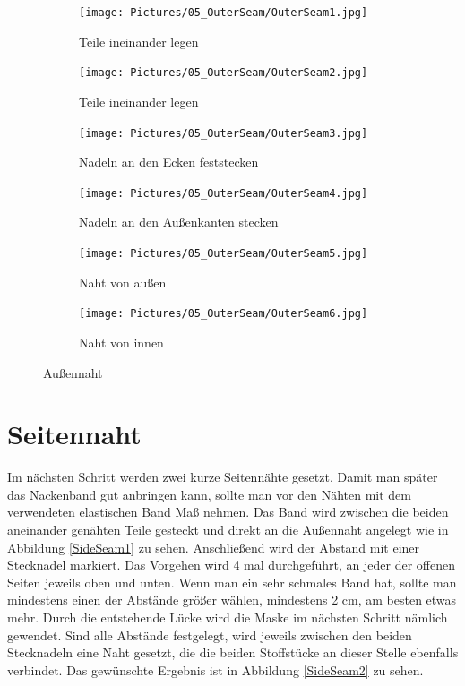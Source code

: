 \documentclass[12pt,parskip=full]{scrartcl}
\begin{document}
\begin{figure}[ht]
    \vspace{0.5cm}
    \centering
    \begin{subfigure}{0.48\textwidth}
        \centering
        \texttt{[image: Pictures/05\_OuterSeam/OuterSeam1.jpg]}
        \caption{Teile ineinander legen}
        \label{OuterSeam1}
    \end{subfigure}
    \begin{subfigure}{0.48\textwidth}
        \centering
        \texttt{[image: Pictures/05\_OuterSeam/OuterSeam2.jpg]}
        \caption{Teile ineinander legen}
        \label{OuterSeam2}
    \end{subfigure}
    \begin{subfigure}{0.48\textwidth}
        \centering
        \texttt{[image: Pictures/05\_OuterSeam/OuterSeam3.jpg]}
        \caption{Nadeln an den Ecken feststecken}
        \label{OuterSeam3}
    \end{subfigure}
    \begin{subfigure}{0.48\textwidth}
        \centering
        \texttt{[image: Pictures/05\_OuterSeam/OuterSeam4.jpg]}
        \caption{Nadeln an den Außenkanten stecken}
        \label{OuterSeam4}
    \end{subfigure}
    \begin{subfigure}{0.48\textwidth}
        \centering
        \texttt{[image: Pictures/05\_OuterSeam/OuterSeam5.jpg]}
        \caption{Naht von außen}
        \label{OuterSeam5}
    \end{subfigure}
    \begin{subfigure}{0.48\textwidth}
        \centering
        \texttt{[image: Pictures/05\_OuterSeam/OuterSeam6.jpg]}
        \caption{Naht von innen}
        \label{OuterSeam6}
    \end{subfigure}
    \caption{Außennaht}
    \label{OuterSeam}
\end{figure}

\section{Seitennaht}
Im nächsten Schritt werden zwei kurze Seitennähte gesetzt. Damit man später das Nackenband gut anbringen kann, sollte man vor den Nähten mit dem verwendeten elastischen Band Maß nehmen. Das Band wird zwischen die beiden aneinander genähten Teile gesteckt und direkt an die Außennaht angelegt wie in Abbildung \ref{SideSeam1} zu sehen. Anschließend wird der Abstand mit einer Stecknadel markiert. Das Vorgehen wird 4 mal durchgeführt, an jeder der offenen Seiten jeweils oben und unten. Wenn man ein sehr schmales Band hat, sollte man mindestens einen der Abstände größer wählen, mindestens 2 cm, am besten etwas mehr. Durch die entstehende Lücke wird die Maske im nächsten Schritt nämlich gewendet. Sind alle Abstände festgelegt, wird jeweils zwischen den beiden Stecknadeln eine Naht gesetzt, die die beiden Stoffstücke an dieser Stelle ebenfalls verbindet. Das gewünschte Ergebnis ist in Abbildung \ref{SideSeam2} zu sehen.
\end{document}
